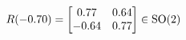 \documentclass[preview]{standalone}
\begin{document}
\begin{align*}
\special{dvisvgm:raw <g id='unique000'>}R(-0.70) = \begin{bmatrix} 0.77 & 0.64 \\ -0.64 & 0.77 \end{bmatrix} \in \text{SO}(2)\special{dvisvgm:raw </g>}
\end{align*}
\end{document}
